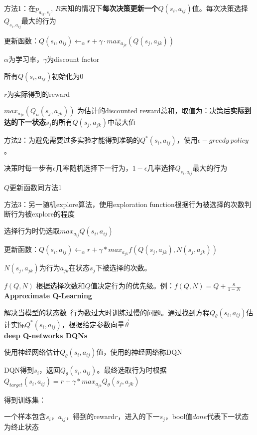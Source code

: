 \documentclass[UTF8]{ctexart}
\begin{document}
  方法1：在$p_{a_{ij}, s_j}$, $R$未知的情况下\textbf{每次决策更新一个}$Q(s_i, a_{ij})$值。每次决策选择$Q_{s_i, a_{ij}}$最大的行为

  \quad 更新函数：$Q(s_i, a_{ij}) \leftarrow_{\alpha} r + \gamma \cdot max_{a_{jk}} (Q(s_j, a_{jk}))$

  \quad \quad $\alpha$为学习率，$\gamma$为discount factor

  \quad \quad 所有$Q(s_i, a_{ij})$初始化为0
  
  \quad \quad $r$为实际得到的reward

  \quad \quad $max_{a_{jk}} (Q_{n}(s_j, a_{jk}))$ 为估计的discounted reward总和，取值为：决策后\textbf{实际到达的下一状态}$s_j$的所有$Q(s_j, a_{jk})$中最大值

  方法2：为避免需要过多实验才能得到准确的$Q^*(s_i, a_{ij})$，使用$\epsilon-greedy\ policy$。
  
  \quad 决策时每一步有$\epsilon$几率随机选择下一行为，$1-\epsilon$几率选择$Q_{s_i, a_{ij}}$最大的行为

  \quad $Q$更新函数同方法1
  
  方法3：另一随机explore算法，使用exploration function根据行为被选择的次数判断行为被explore的程度
  
  \quad 选择行为时仍选取$max_{a_{ij}} Q(s_i, a_{ij})$
  
  \quad 更新函数：$Q(s_i, a_{ij}) \leftarrow_{\alpha} r + \gamma * max_{a_{jk}} f(Q(s_j, a_{jk}), N(s_j, a_{jk}))$
  
  \quad \quad $N(s_j, a_{jk})$为行为$a_{jk}$在状态$s_j$下被选择的次数。
  
  \quad \quad $f(Q, N)$ 根据选择次数和$Q$值决定行为的优先级。例：$f(Q, N) = Q + \frac{\kappa}{1 - N} $\\
\textbf{Approximate Q-Learning}

  解决当模型的状态数\ 行为数过大时训练过慢的问题。通过找到方程$Q_{\theta}(s_i, a_{ij})$估计实际$Q^*(s_i, a_{ij})$，根据给定参数向量$\vec{\theta}$\\
\textbf{deep Q-networks DQNs}

  使用神经网络估计$Q_{\theta}(s_i, a_{ij})$值，使用的神经网络称DQN
  
  DQN得到$s_i$，返回$Q_{\theta}(s_i, a_{ij})$。最终选取行为时根据$Q_{target}(s_i, a_{ij}) = r + \gamma * max_{a_{jk}} Q_{\theta}(s_j, a_{jk})$

  得到训练集：

  \quad 一个样本包含$s_i$，$a_{ij}$，得到的reward$r$，进入的下一$s_j$，bool值$done$代表下一状态为终止状态
\end{document}
